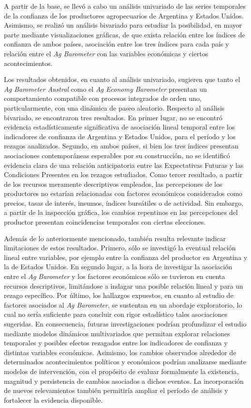 \documentclass[12pt]{article}
\begin{document}
A partir de la base, se llevó a cabo un análisis univariado de las
series temporales de la confianza de los productores agropecuarios de
Argentina y Estados Unidos. Asimismo, se realizó un análisis bivariado
para estudiar la posibilidad, en mayor parte mediante visualizaciones
gráficas, de que exista relación entre los índices de confianza de ambos
países, asociación entre los tres índices para cada país y relación
entre el \emph{Ag Barometer} con las variables económicas y ciertos
acontecimientos.

Los resultados obtenidos, en cuanto al análisis univariado, sugieren que
tanto el \emph{Ag Barometer Austral} como el \emph{Ag Economy Barometer}
presentan un comportamiento compatible con procesos integrados de orden
uno, particularmente, con una dinámica de paseo aleatorio. Respecto al
análisis bivariado, se encontraron tres resultados. En primer lugar, no
se encontró evidencia estadísticamente significativa de asociación
lineal temporal entre los indicadores de confianza de Argentina y
Estados Unidos, para el período y los rezagos analizados. Segundo, en
ambos países, si bien los tres índices presentan asociaciones
contemporáneas esperables por su construcción, no se identificó
evidencia clara de una relación anticipatoria entre las Expectativas
Futuras y las Condiciones Presentes en los rezagos estudiados. Como
tercer resultado, a partir de los recursos meramente descriptivos
empleados, las percepciones de los productores no estarían relacionadas
con factores económicos considerados como precios, tasas de interés,
insumos, índices bursátiles o de actividad. Sin embargo, a partir de la
inspección gráfica, los cambios repentinos en las percepciones del
productor presentan coincidencias temporales con ciertas elecciones.

Además de lo anteriormente mencionado, también resulta relevante indicar
limitaciones de estos resultados. Primero, sólo se investigó la eventual
relación lineal entre variables, por ejemplo entre la confianza del
productor en Argentina y la de Estados Unidos. En segundo lugar, a la
hora de investigar la asociación entre el \emph{Ag Barometer} y los
factores económicos sólo se tuvieron en cuenta recursos descriptivos,
limitándose a indagar una posible relación lineal y para un rezago
específico. Por último, los hallazgos expuestos, en cuanto al estudio de
factores asociados al \emph{Ag Barometer}, se sustentan en un abordaje
exploratorio, lo cual no sería suficiente para concluir con rigor
estadístico tales asociaciones sugeridas. En consecuencia, futuras
investigaciones podrían profundizar el estudio mediante modelos
dinámicos multivariados que permitan explorar relaciones temporales y
posibles efectos rezagados entre los indicadores de confianza y
distintas variables económicas. Asimismo, los cambios observados
alrededor de determinados acontecimientos políticos y económicos podrían
analizarse mediante modelos de intervención, con el propósito de evaluar
formalmente la existencia, magnitud y persistencia de cambios asociados
a dichos eventos. La incorporación de nuevos relevamientos también
permitiría ampliar el período de análisis y fortalecer la evidencia
disponible.
\end{document}

